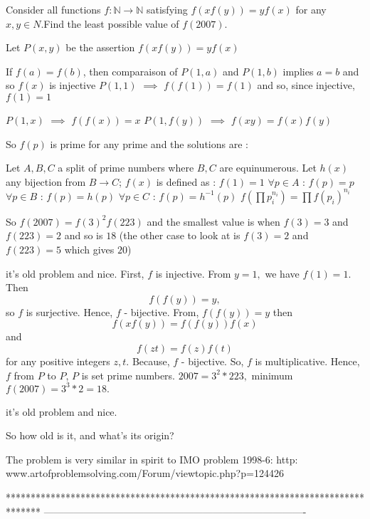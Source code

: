 \begin{solution}
	\begin{tcolorbox}Consider all functions $f: \mathbb{N}\to\mathbb{N}$ satisfying $f(xf(y))=yf(x)$ for any $x,y{\in}N$.Find the least possible value of $f(2007)$.\end{tcolorbox}
Let $P(x,y)$ be the assertion $f(xf(y))=yf(x)$

If $f(a)=f(b)$, then comparaison of $P(1,a)$ and $P(1,b)$ implies $a=b$ and so $f(x)$ is injective
$P(1,1)$ $\implies$ $f(f(1))=f(1)$ and so, since injective, $f(1)=1$

$P(1,x)$ $\implies$ $f(f(x))=x$
$P(1,f(y))$ $\implies$ $f(xy)=f(x)f(y)$

So $f(p)$ is prime for any prime and the solutions are :

Let $A,B,C$ a split of prime numbers where $B,C$ are equinumerous.
Let $h(x)$ any bijection from $B\to C$;
$f(x)$ is defined as :
$f(1)=1$
$\forall p\in A$ : $f(p)=p$
$\forall p\in B$ : $f(p)=h(p)$
$\forall p\in C$ : $f(p)=h^{-1}(p)$
$f(\prod p_i^{n_i})=\prod f(p_i)^{n_i}$

So $f(2007)=f(3)^2f(223)$ and the smallest value is when $f(3)=3$ and $f(223)=2$ and so is $\boxed{18}$
(the other case to look at is $f(3)=2$ and $f(223)=5$ which gives $20$)
\end{solution}



\begin{solution}
	it's old problem and  nice.
 First, $ f $ is injective.  From $y=1,$ we have $ f(1)=1.$
Then  \[ f(f(y))=y, \]  so  $f$ is surjective. Hence, $f$ - bijective.
From,  $ f(f(y))=y $  then  \[ f(xf(y))=f(f(y))f(x) \]  and  \[ f(zt)=f(z)f(t) \]  for any positive integers $z,t.$ 
Because, $f$ - bijective.
So,  $f$ is multiplicative. Hence,   $f$  from $P$ to $P$,
$P$ is set prime numbers.
$ 2007=3^2 *223, $ minimum $ f(2007)=3^3 *2=18. $
\end{solution}



\begin{solution}
	\begin{tcolorbox}it's old problem and  nice.\end{tcolorbox}
So how old is it, and what's its origin?

The problem is very similar in spirit to IMO problem 1998-6:
      http: \/\/www.artofproblemsolving.com/Forum/viewtopic.php?p=124426
\end{solution}
*******************************************************************************
-------------------------------------------------------------------------------

